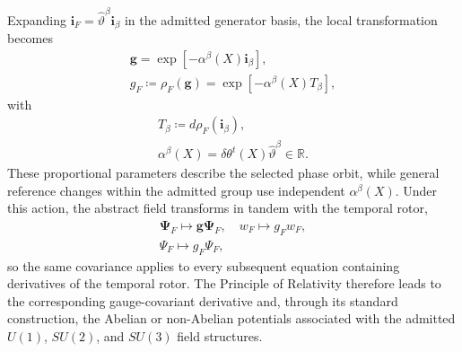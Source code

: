 Expanding $\mathbf{i}_{F}=\hat{\vartheta}^{\beta}\mathbf{i}_{\beta}$ in the admitted generator basis, the local transformation becomes
\begin{equation}
\begin{gathered}
    \mathbf{g}=\exp[-\alpha^{\beta}(X)\mathbf{i}_{\beta}],\\
    g_{F}\coloneqq\rho_{F}(\mathbf{g})=\exp[-\alpha^{\beta}(X)T_{\beta}],
\end{gathered}
\end{equation}
with
\begin{equation}
\begin{gathered}
    T_{\beta}\coloneqq d\rho_{F}(\mathbf{i}_{\beta}),\\
    \alpha^{\beta}(X)=\delta\theta^{t}(X)\hat{\vartheta}^{\beta}\in\mathbb{R}.
\end{gathered}
\end{equation}
These proportional parameters describe the selected phase orbit, while general reference changes within the admitted group use independent $\alpha^{\beta}(X)$. Under this action, the abstract field transforms in tandem with the temporal rotor,
\begin{equation}
\begin{gathered}
    \boldsymbol{\Psi}_{F}\mapsto\mathbf{g}\boldsymbol{\Psi}_{F},\quad w_{F}\mapsto g_{F}w_{F},\\
    \Psi_{F}\mapsto g_{F}\Psi_{F},
\end{gathered}
\end{equation}
so the same covariance applies to every subsequent equation containing derivatives of the temporal rotor. The Principle of Relativity therefore leads to the corresponding gauge-covariant derivative and, through its standard construction, the Abelian or non-Abelian potentials associated with the admitted $U(1)$, $SU(2)$, and $SU(3)$ field structures.
